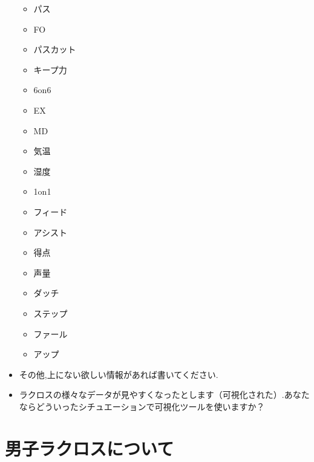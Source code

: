 \documentclass[sotsuron]{kuee}
\begin{document}
\begin{itemize}
\begin{itemize}
				\item パス
				\item FO
				\item パスカット
				\item キープ力
				\item 6on6
				\item EX
				\item MD
				\item 気温
				\item 湿度
				\item 1on1
				\item フィード
				\item アシスト
				\item 得点
				\item 声量
				\item ダッチ
				\item ステップ
				\item ファール
				\item アップ
			\end{itemize}
		\item その他,上にない欲しい情報があれば書いてください.
		\item ラクロスの様々なデータが見やすくなったとします（可視化された）.あなたならどういったシチュエーションで可視化ツールを使いますか？
	\end{itemize}

\chapter{男子ラクロスについて}
\end{document}
